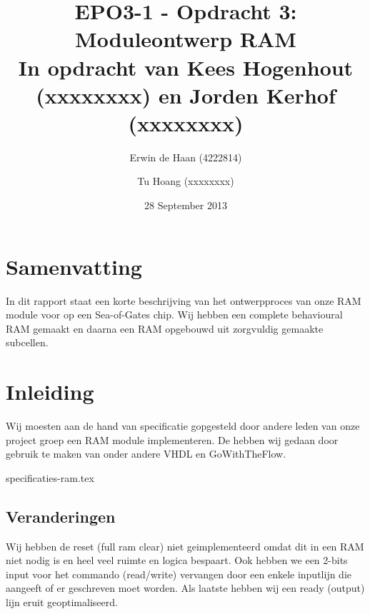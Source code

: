 \documentclass{article}
\author{Erwin de Haan (4222814) \and Tu Hoang (xxxxxxxx)}
\title{EPO3-1 - Opdracht 3: Moduleontwerp RAM \\ \vspace{2 mm} {\large In opdracht van Kees Hogenhout (xxxxxxxx) en Jorden Kerhof (xxxxxxxx)}}
\date{28 September 2013}
\begin{document}
\maketitle
{}
\section*{Samenvatting}
In dit rapport staat een korte beschrijving van het ontwerpproces van onze RAM module voor op een Sea-of-Gates chip.
Wij hebben een complete behavioural RAM gemaakt en daarna een RAM opgebouwd uit zorgvuldig gemaakte subcellen.
\newpage
\setlength{\cftbeforetoctitleskip}{-3em}
\tableofcontents

\section{Inleiding}
Wij moesten aan de hand van specificatie gopgesteld door andere leden van onze project groep een RAM module implementeren.
De hebben wij gedaan door gebruik te maken van onder andere VHDL en GoWithTheFlow. \cite{epo3-manual}

\newpage
{}

{specificaties-ram.tex}

\subsection{Veranderingen}
Wij hebben de reset (full ram clear) niet geimplementeerd omdat dit in een RAM niet nodig is en heel veel ruimte en logica bespaart.
Ook hebben we een 2-bits input voor het commando (read/write) vervangen door een enkele inputlijn die aangeeft of er geschreven moet worden.
Als laatste hebben wij een ready (output) lijn eruit geoptimaliseerd.
\end{document}
